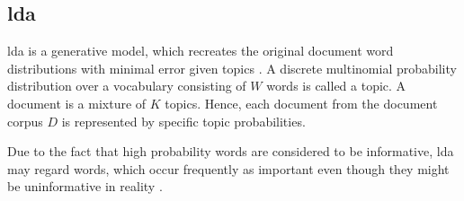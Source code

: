 
\subsection{\ac{lda}}\label{subsec:latent-dirichlet-allocation}

\ac{lda} is a generative model, which recreates the original document word distributions with minimal error given topics \cite{topic_modeling2015, Top2Vec2020}.
A discrete multinomial probability distribution over a vocabulary consisting of $W$ words is called a topic.
A document is a mixture of $K$ topics.
Hence, each document from the document corpus $D$ is represented by specific topic probabilities.

Due to the fact that high probability words are considered to be informative, \ac{lda} may regard words, 
which occur frequently as important even though they might be uninformative in reality \cite{Top2Vec2020}.

\cite{clusteringDocs2020}